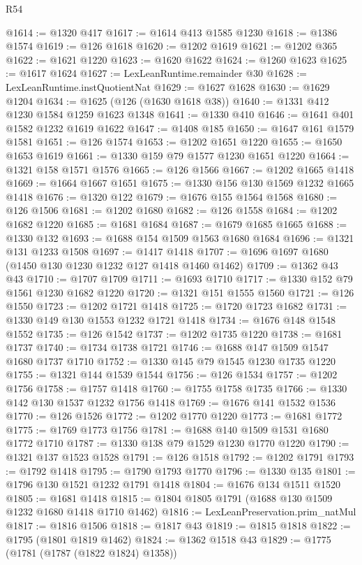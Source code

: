 \begin{lexlean}{R54}
\begin{coremodule}
@1614 := @1320 @417
@1617 := @1614 @413 @1585 @1230
@1618 := @1386 @1574
@1619 := @126 @1618
@1620 := @1202 @1619
@1621 := @1202 @365
@1622 := @1621 @1220
@1623 := @1620 @1622
@1624 := @1260 @1623
@1625 := @1617 @1624
@1627 := LexLeanRuntime.remainder @30
@1628 := LexLeanRuntime.instQuotientNat
@1629 := @1627 @1628
@1630 := @1629 @1204
@1634 := @1625 (@126 (@1630 @1618 @38))
@1640 := @1331 @412 @1230 @1584 @1259 @1623 @1348
@1641 := @1330 @410
@1646 := @1641 @401 @1582 @1232 @1619 @1622
@1647 := @1408 @185
@1650 := @1647 @161 @1579 @1581
@1651 := @126 @1574
@1653 := @1202 @1651 @1220
@1655 := @1650 @1653 @1619
@1661 := @1330 @159 @79 @1577 @1230 @1651 @1220
@1664 := @1321 @158 @1571 @1576
@1665 := @126 @1566
@1667 := @1202 @1665 @1418
@1669 := @1664 @1667 @1651
@1675 := @1330 @156 @130 @1569 @1232 @1665 @1418
@1676 := @1320 @122
@1679 := @1676 @155 @1564 @1568
@1680 := @126 @1506
@1681 := @1202 @1680
@1682 := @126 @1558
@1684 := @1202 @1682 @1220
@1685 := @1681 @1684
@1687 := @1679 @1685 @1665
@1688 := @1330 @132
@1693 := @1688 @154 @1509 @1563 @1680 @1684
@1696 := @1321 @131 @1233 @1508
@1697 := @1417 @1418
@1707 := @1696 @1697 @1680 (@1450 @130 @1230 @1232 @127 @1418 @1460 @1462)
@1709 := @1362 @43 @43
@1710 := @1707 @1709
@1711 := @1693 @1710
@1717 := @1330 @152 @79 @1561 @1230 @1682 @1220
@1720 := @1321 @151 @1555 @1560
@1721 := @126 @1550
@1723 := @1202 @1721 @1418
@1725 := @1720 @1723 @1682
@1731 := @1330 @149 @130 @1553 @1232 @1721 @1418
@1734 := @1676 @148 @1548 @1552
@1735 := @126 @1542
@1737 := @1202 @1735 @1220
@1738 := @1681 @1737
@1740 := @1734 @1738 @1721
@1746 := @1688 @147 @1509 @1547 @1680 @1737 @1710
@1752 := @1330 @145 @79 @1545 @1230 @1735 @1220
@1755 := @1321 @144 @1539 @1544
@1756 := @126 @1534
@1757 := @1202 @1756
@1758 := @1757 @1418
@1760 := @1755 @1758 @1735
@1766 := @1330 @142 @130 @1537 @1232 @1756 @1418
@1769 := @1676 @141 @1532 @1536
@1770 := @126 @1526
@1772 := @1202 @1770 @1220
@1773 := @1681 @1772
@1775 := @1769 @1773 @1756
@1781 := @1688 @140 @1509 @1531 @1680 @1772 @1710
@1787 := @1330 @138 @79 @1529 @1230 @1770 @1220
@1790 := @1321 @137 @1523 @1528
@1791 := @126 @1518
@1792 := @1202 @1791
@1793 := @1792 @1418
@1795 := @1790 @1793 @1770
@1796 := @1330 @135
@1801 := @1796 @130 @1521 @1232 @1791 @1418
@1804 := @1676 @134 @1511 @1520
@1805 := @1681 @1418
@1815 := @1804 @1805 @1791 (@1688 @130 @1509 @1232 @1680 @1418 @1710 @1462)
@1816 := LexLeanPreservation.prim_natMul
@1817 := @1816 @1506
@1818 := @1817 @43
@1819 := @1815 @1818
@1822 := @1795 (@1801 @1819 @1462)
@1824 := @1362 @1518 @43
@1829 := @1775 (@1781 (@1787 (@1822 @1824) @1358))

\end{coremodule}
\end{lexlean}
